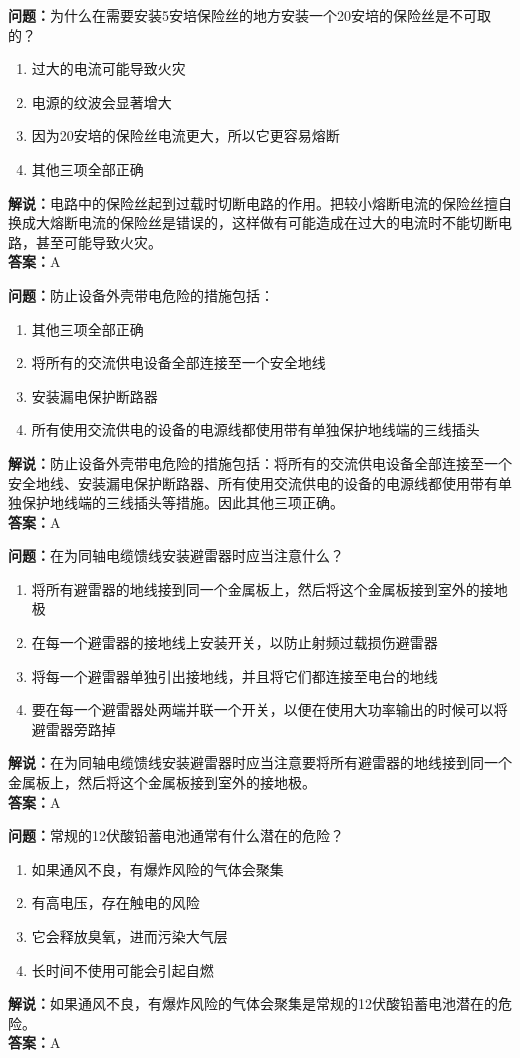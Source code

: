 \documentclass{ctexbook}%
\begin{document}
\textbf{问题：}为什么在需要安装5安培保险丝的地方安装一个20安培的保险丝是不可取的？
\begin{enumerate}[label=\Alph*), leftmargin=3em]
\item 过大的电流可能导致火灾
\item 电源的纹波会显著增大
\item 因为20安培的保险丝电流更大，所以它更容易熔断
\item 其他三项全部正确
\end{enumerate}
\textbf{解说：}电路中的保险丝起到过载时切断电路的作用。把较小熔断电流的保险丝擅自换成大熔断电流的保险丝是错误的，这样做有可能造成在过大的电流时不能切断电路，甚至可能导致火灾。\\
\textbf{答案：}A

\textbf{问题：}防止设备外壳带电危险的措施包括：
\begin{enumerate}[label=\Alph*), leftmargin=3em]
\item 其他三项全部正确
\item 将所有的交流供电设备全部连接至一个安全地线
\item 安装漏电保护断路器
\item 所有使用交流供电的设备的电源线都使用带有单独保护地线端的三线插头
\end{enumerate}
\textbf{解说：}防止设备外壳带电危险的措施包括：将所有的交流供电设备全部连接至一个安全地线、安装漏电保护断路器、所有使用交流供电的设备的电源线都使用带有单独保护地线端的三线插头等措施。因此其他三项正确。\\
\textbf{答案：}A

\textbf{问题：}在为同轴电缆馈线安装避雷器时应当注意什么？
\begin{enumerate}[label=\Alph*), leftmargin=3em]
\item 将所有避雷器的地线接到同一个金属板上，然后将这个金属板接到室外的接地极
\item 在每一个避雷器的接地线上安装开关，以防止射频过载损伤避雷器
\item 将每一个避雷器单独引出接地线，并且将它们都连接至电台的地线
\item 要在每一个避雷器处两端并联一个开关，以便在使用大功率输出的时候可以将避雷器旁路掉
\end{enumerate}
\textbf{解说：}在为同轴电缆馈线安装避雷器时应当注意要将所有避雷器的地线接到同一个金属板上，然后将这个金属板接到室外的接地极。\\
\textbf{答案：}A

\textbf{问题：}常规的12伏酸铅蓄电池通常有什么潜在的危险？
\begin{enumerate}[label=\Alph*), leftmargin=3em]
\item 如果通风不良，有爆炸风险的气体会聚集
\item 有高电压，存在触电的风险
\item 它会释放臭氧，进而污染大气层
\item 长时间不使用可能会引起自燃
\end{enumerate}
\textbf{解说：}如果通风不良，有爆炸风险的气体会聚集是常规的12伏酸铅蓄电池潜在的危险。\\
\textbf{答案：}A
\end{document}
